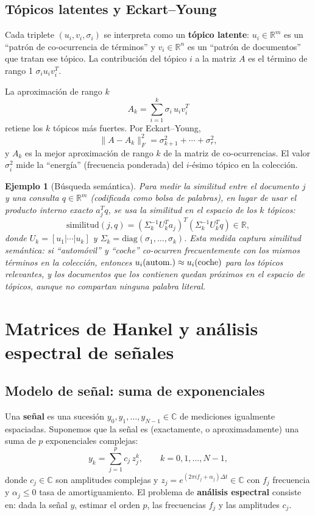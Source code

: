 \documentclass[12pt]{article}
\newtheorem{example}[theorem]{Ejemplo}
\newcommand{\R}{\mathbb{R}}
\newcommand{\C}{\mathbb{C}}
\begin{document}
\subsection{Tópicos latentes y Eckart--Young}

Cada triplete $(u_i, v_i, \sigma_i)$ se interpreta como un \textbf{tópico latente}: $u_i \in \R^m$ es un ``patrón de co-ocurrencia de términos'' y $v_i \in \R^n$ es un ``patrón de documentos'' que tratan ese tópico. La contribución del tópico $i$ a la matriz $A$ es el término de rango 1 $\sigma_i u_i v_i^T$.

La aproximación de rango $k$
\[
  A_k = \sum_{i=1}^k \sigma_i\, u_i v_i^T
\]
retiene los $k$ tópicos más fuertes. Por Eckart--Young,
\[
  \|A - A_k\|_F^2 = \sigma_{k+1}^2 + \cdots + \sigma_r^2,
\]
y $A_k$ es la mejor aproximación de rango $k$ de la matriz de co-ocurrencias. El valor $\sigma_i^2$ mide la ``energía'' (frecuencia ponderada) del $i$-ésimo tópico en la colección.

\begin{example}[Búsqueda semántica]
Para medir la similitud entre el documento $j$ y una consulta $q \in \R^m$ (codificada como bolsa de palabras), en lugar de usar el producto interno exacto $a_j^T q$, se usa la similitud en el espacio de los $k$ tópicos:
\[
  \text{similitud}(j, q) = (\Sigma_k^{-1} U_k^T a_j)^T (\Sigma_k^{-1} U_k^T q) \in \R,
\]
donde $U_k = [u_1|\cdots|u_k]$ y $\Sigma_k = \mathrm{diag}(\sigma_1,\ldots,\sigma_k)$. Esta medida captura similitud \emph{semántica}: si ``automóvil'' y ``coche'' co-ocurren frecuentemente con los mismos términos en la colección, entonces $u_i({\rm autom.}) \approx u_i({\rm coche})$ para los tópicos relevantes, y los documentos que los contienen quedan próximos en el espacio de tópicos, aunque no compartan ninguna palabra literal.
\end{example}

\section{Matrices de Hankel y análisis espectral de señales}

\subsection{Modelo de señal: suma de exponenciales}

Una \textbf{señal} es una sucesión $y_0, y_1, \ldots, y_{N-1} \in \C$ de mediciones igualmente espaciadas. Suponemos que la señal es (exactamente, o aproximadamente) una suma de $p$ exponenciales complejas:
\[
  y_k = \sum_{j=1}^p c_j\, z_j^k, \qquad k = 0, 1, \ldots, N-1,
\]
donde $c_j \in \C$ son amplitudes complejas y $z_j = e^{(2\pi i f_j + \alpha_j)\Delta t} \in \C$ con $f_j$ frecuencia y $\alpha_j \leq 0$ tasa de amortiguamiento. El problema de \textbf{análisis espectral} consiste en: dada la señal $y$, estimar el orden $p$, las frecuencias $f_j$ y las amplitudes $c_j$.
\end{document}
